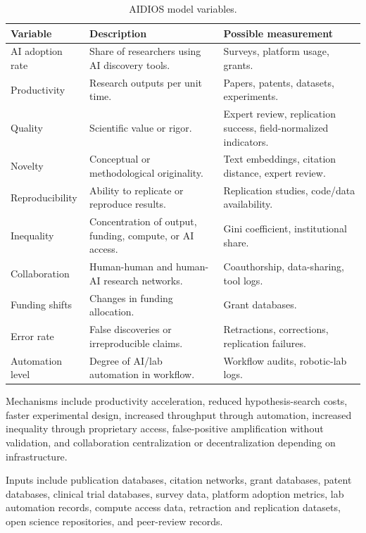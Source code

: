 \documentclass[12pt]{article}
\begin{document}
\begin{table}[H]
\centering
\caption{AIDIOS model variables.}
\small
\begin{tabularx}{\textwidth}{p{3.0cm}X X}
\toprule
\textbf{Variable} & \textbf{Description} & \textbf{Possible measurement} \\
\midrule
AI adoption rate & Share of researchers using AI discovery tools. & Surveys, platform usage, grants. \\
Productivity & Research outputs per unit time. & Papers, patents, datasets, experiments. \\
Quality & Scientific value or rigor. & Expert review, replication success, field-normalized indicators. \\
Novelty & Conceptual or methodological originality. & Text embeddings, citation distance, expert review. \\
Reproducibility & Ability to replicate or reproduce results. & Replication studies, code/data availability. \\
Inequality & Concentration of output, funding, compute, or AI access. & Gini coefficient, institutional share. \\
Collaboration & Human-human and human-AI research networks. & Coauthorship, data-sharing, tool logs. \\
Funding shifts & Changes in funding allocation. & Grant databases. \\
Error rate & False discoveries or irreproducible claims. & Retractions, corrections, replication failures. \\
Automation level & Degree of AI/lab automation in workflow. & Workflow audits, robotic-lab logs. \\
\bottomrule
\end{tabularx}
\end{table}

Mechanisms include productivity acceleration, reduced hypothesis-search costs, faster experimental design, increased throughput through automation, increased inequality through proprietary access, false-positive amplification without validation, and collaboration centralization or decentralization depending on infrastructure.

Inputs include publication databases, citation networks, grant databases, patent databases, clinical trial databases, survey data, platform adoption metrics, lab automation records, compute access data, retraction and replication datasets, open science repositories, and peer-review records.
\end{document}
